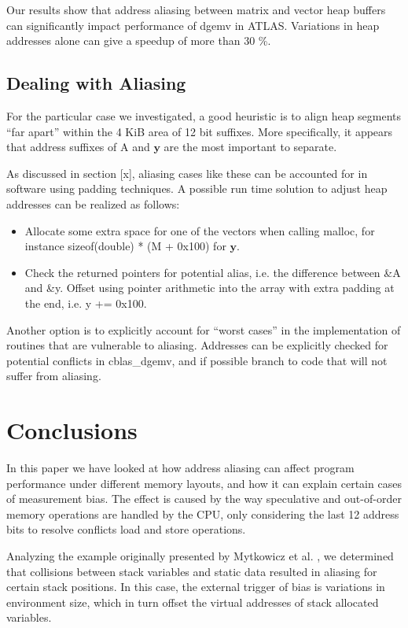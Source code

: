 \documentclass[a4paper,10pt,twocolumn,twoside]{article}
\begin{document}
Our results show that address aliasing between matrix and vector heap buffers can significantly impact performance of dgemv in ATLAS.
Variations in heap addresses alone can give a speedup of more than 30 \%.


\subsection{Dealing with Aliasing}
For the particular case we investigated, a good heuristic is to align heap segments “far apart” within the 4 KiB area of 12 bit suffixes.
More specifically, it appears that address suffixes of A and $\boldsymbol{y}$ are the most important to separate.

As discussed in section [x], aliasing cases like these can be accounted for in software using padding techniques.
A possible run time solution to adjust heap addresses can be realized as follows:

\begin{itemize}
  \item Allocate some extra space for one of the vectors when calling malloc, for instance sizeof(double) * (M + 0x100) for $\boldsymbol{y}$.

  \item Check the returned pointers for potential alias, i.e. the difference between \&A and \&y. Offset using pointer arithmetic into the array with extra padding at the end, i.e. y += 0x100. 
\end{itemize}

Another option is to explicitly account for “worst cases” in the implementation of routines that are vulnerable to aliasing.
Addresses can be explicitly checked for potential conflicts in cblas\_dgemv, and if possible branch to code that will not suffer from aliasing. 

\fi


\section{Conclusions}
In this paper we have looked at how address aliasing can affect program performance under different memory layouts, and how it can explain certain cases of measurement bias. 
The effect is caused by the way speculative and out-of-order memory operations are handled by the CPU, only considering the last 12 address bits to resolve conflicts load and store operations.

Analyzing the example originally presented by Mytkowicz et al. \cite{Mytkowicz:2009:WrongData}, we determined that collisions between stack variables and static data resulted in aliasing for certain stack positions.
In this case, the external trigger of bias is variations in environment size, which in turn offset the virtual addresses of stack allocated variables.
\end{document}
